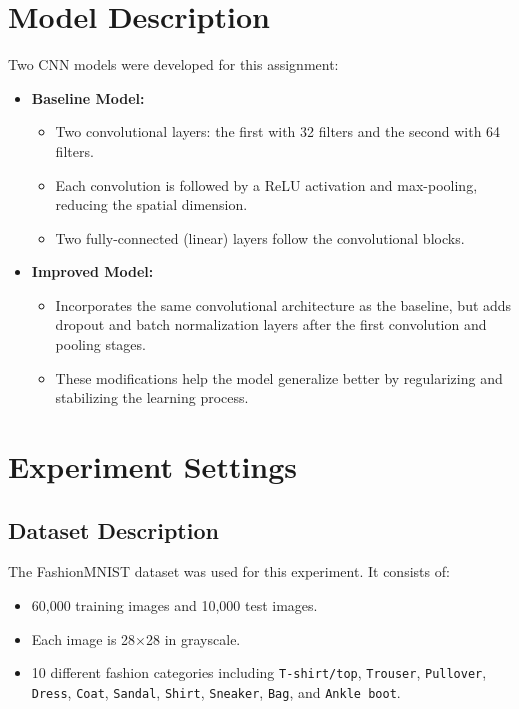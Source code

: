 \documentclass[letterpaper]{article}
\begin{document}
	\section{Model Description}
	Two CNN models were developed for this assignment:
	\begin{itemize}
		\item \textbf{Baseline Model:} 
		\begin{itemize}
			\item Two convolutional layers: the first with 32 filters and the second with 64 filters.
			\item Each convolution is followed by a ReLU activation and max-pooling, reducing the spatial dimension.
			\item Two fully-connected (linear) layers follow the convolutional blocks.
		\end{itemize}
		\item \textbf{Improved Model:}
		\begin{itemize}
			\item Incorporates the same convolutional architecture as the baseline, but adds dropout and batch normalization layers after the first convolution and pooling stages.
			\item These modifications help the model generalize better by regularizing and stabilizing the learning process.
		\end{itemize}
	\end{itemize}
	
	\section{Experiment Settings}
	\subsection{Dataset Description}
	The FashionMNIST dataset was used for this experiment. It consists of:
	\begin{itemize}
		\item 60,000 training images and 10,000 test images.
		\item Each image is 28$\times$28 in grayscale.
		\item 10 different fashion categories including \texttt{T-shirt/top}, \texttt{Trouser}, \texttt{Pullover}, \texttt{Dress}, \texttt{Coat}, \texttt{Sandal}, \texttt{Shirt}, \texttt{Sneaker}, \texttt{Bag}, and \texttt{Ankle boot}.
	\end{itemize}
	
\end{document}
